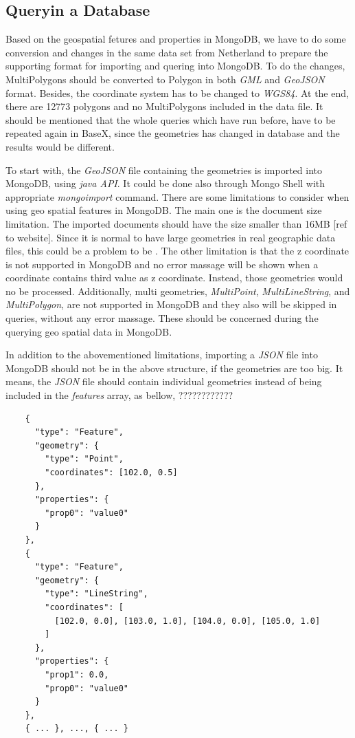 \documentclass[a4paper,12pt]{article}
\begin{document}
\subsection{Queryin a Database}

Based on the geospatial fetures and properties in MongoDB, we have to do some conversion and changes in the same data set from Netherland to prepare the supporting format for importing and quering into MongoDB. To do the changes, MultiPolygons should be converted to Polygon in both \textit{GML} and \textit{GeoJSON} format. Besides, the coordinate system has to be changed to \textit{WGS84}. At the end, there are 12773 polygons and no MultiPolygons included in the data file. It should be mentioned that the whole queries which have run before, have to be repeated again in BaseX, since the geometries has changed in database and the results would be different.

To start with, the \textit{GeoJSON} file containing the geometries is imported into MongoDB, using \textit{java API}. It could be done also through Mongo Shell with appropriate \textit{mongoimport} command. There are some limitations to consider when using geo spatial features in MongoDB. The main one is the document size limitation. The imported documents should have the size smaller than 16MB [ref to website]. Since it is normal to have large geometries in real geographic data files, this could be a problem to be . The other limitation is that the z coordinate is not supported in MongoDB and no error massage will be shown when a coordinate contains third value as z coordinate. Instead, those geometries would no be processed. Additionally, multi geometries, \textit{MultiPoint}, \textit{MultiLineString}, and \textit{MultiPolygon}, are not supported in MongoDB and they also will be skipped in queries, without any error massage. These should be concerned during the querying geo spatial data in MongoDB.

In addition to the abovementioned limitations, importing a \textit{JSON} file into MongoDB should not be in the above structure, if the geometries are too big. It means, the \textit{JSON} file should contain individual geometries instead of being included in the \textit{features} array, as bellow, ????????????
 
\begin{verbatim}
    {
      "type": "Feature",
      "geometry": {
        "type": "Point",
        "coordinates": [102.0, 0.5]
      },
      "properties": {
        "prop0": "value0"
      }
    },
    {
      "type": "Feature",
      "geometry": {
        "type": "LineString",
        "coordinates": [
          [102.0, 0.0], [103.0, 1.0], [104.0, 0.0], [105.0, 1.0]
        ]
      },
      "properties": {
        "prop1": 0.0,
        "prop0": "value0"
      }
    }, 
    { ... }, ..., { ... }
\end{verbatim}
\end{document}
